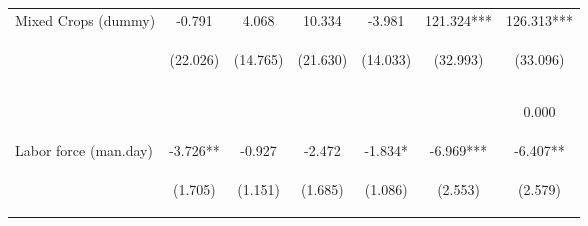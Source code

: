 \begin{center}
\begin{tabular}{lcccccc}
Mixed Crops (dummy) & -0.791 & 4.068 & 10.334 & -3.981 & 121.324*** & 126.313*** \\
 & \begin{footnotesize}(22.026)\end{footnotesize} & \begin{footnotesize}(14.765)\end{footnotesize} & \begin{footnotesize}(21.630)\end{footnotesize} & \begin{footnotesize}(14.033)\end{footnotesize} & \begin{footnotesize}(32.993)\end{footnotesize} & \begin{footnotesize}(33.096)\end{footnotesize} \\
\vspace{4pt} & \begin{footnotesize}[0.971]\end{footnotesize} & \begin{footnotesize}[0.783]\end{footnotesize} & \begin{footnotesize}[0.633]\end{footnotesize} & \begin{footnotesize}[0.777]\end{footnotesize} & \begin{footnotesize}[0.000]\end{footnotesize} & \begin{footnotesize}0.000\end{footnotesize} \\
Labor force (man.day) & -3.726** & -0.927 & -2.472 & -1.834* & -6.969*** & -6.407** \\
 & \begin{footnotesize}(1.705)\end{footnotesize} & \begin{footnotesize}(1.151)\end{footnotesize} & \begin{footnotesize}(1.685)\end{footnotesize} & \begin{footnotesize}(1.086)\end{footnotesize} & \begin{footnotesize}(2.553)\end{footnotesize} & \begin{footnotesize}(2.579)\end{footnotesize} \\

\end{tabular}
\end{center}
